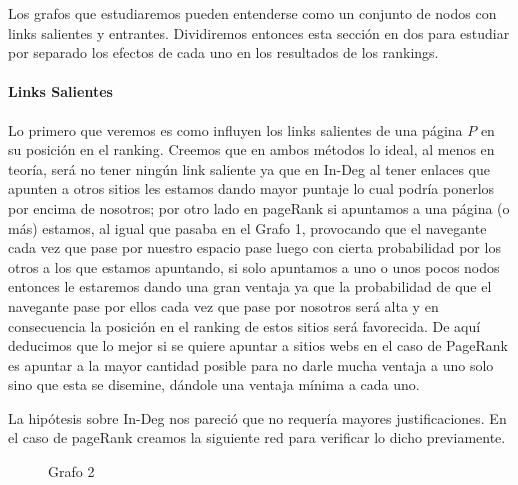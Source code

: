 Los grafos que estudiaremos pueden entenderse como un conjunto de nodos con links salientes y entrantes. Dividiremos entonces esta sección en dos para estudiar por separado los efectos de cada uno en los resultados de los rankings.

\paragraph{Links Salientes}
 Lo primero que veremos es como influyen los links salientes de una página $P$ en su posición en el ranking. Creemos que en ambos métodos lo ideal, al menos en teoría, será no tener ningún link saliente ya que en In-Deg al tener enlaces que apunten a otros sitios les estamos dando mayor puntaje lo cual podría ponerlos por encima de nosotros; por otro lado en pageRank si apuntamos a una página (o más) estamos, al igual que pasaba en el Grafo 1, provocando que el navegante cada vez que pase por nuestro espacio pase luego con cierta probabilidad por los otros a los que estamos apuntando, si solo apuntamos a uno o unos pocos nodos entonces le estaremos dando una gran ventaja ya que la probabilidad de que el navegante pase por ellos cada vez que pase por nosotros será alta y en consecuencia la posición en el ranking de estos sitios será favorecida. De aquí deducimos que lo mejor si se quiere apuntar a sitios webs en el caso de PageRank es apuntar a la mayor cantidad posible para no darle mucha ventaja a uno solo sino que esta se disemine, dándole una ventaja mínima a cada uno.

La hipótesis sobre In-Deg nos pareció que no requería mayores justificaciones. En el caso de pageRank creamos la siguiente red para verificar lo dicho previamente.

\begin{figure}[H]
\centering
{}
  \caption{\footnotesize{ Grafo 2 }}
  \label{fig:Rankings}
\end{figure}

